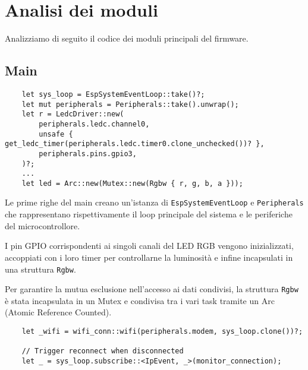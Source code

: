 \section{Analisi dei moduli}

Analizziamo di seguito il codice dei moduli principali del firmware.

\subsection{Main}

\begin{listing}[H]
    \begin{verbatim}
    let sys_loop = EspSystemEventLoop::take()?;
    let mut peripherals = Peripherals::take().unwrap();
    let r = LedcDriver::new(
        peripherals.ledc.channel0,
        unsafe { get_ledc_timer(peripherals.ledc.timer0.clone_unchecked())? },
        peripherals.pins.gpio3,
    )?;
    ...
    let led = Arc::new(Mutex::new(Rgbw { r, g, b, a }));
\end{verbatim}
\end{listing}

Le prime righe del main creano un'istanza di \texttt{EspSystemEventLoop} e \texttt{Peripherals}
che rappresentano rispettivamente il loop principale del sistema e le periferiche del microcontrollore.

I pin GPIO corrispondenti ai singoli canali del LED RGB vengono inizializzati, accoppiati con i loro timer per 
controllarne la luminosità e infine incapsulati in una struttura \texttt{Rgbw}.

Per garantire la mutua esclusione nell'accesso ai dati condivisi, la struttura \texttt{Rgbw} è stata incapsulata in un Mutex e 
condivisa tra i vari task tramite un Arc (Atomic Reference Counted).

\begin{listing}[H]
    \begin{verbatim}
    let _wifi = wifi_conn::wifi(peripherals.modem, sys_loop.clone())?;

    // Trigger reconnect when disconnected
    let _ = sys_loop.subscribe::<IpEvent, _>(monitor_connection);
\end{verbatim}
\end{listing}

